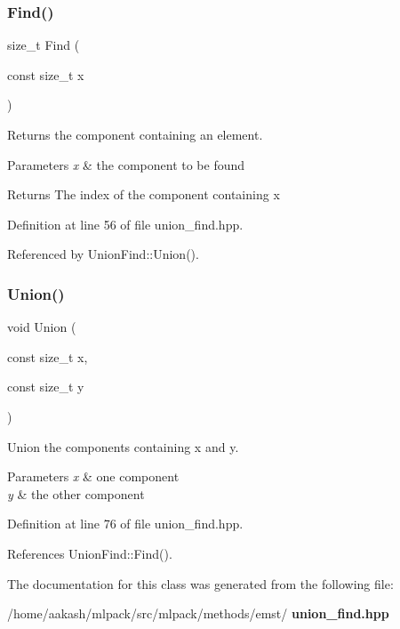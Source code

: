 \subsubsection{Find()}
{\footnotesize\ttfamily size\+\_\+t Find (\begin{DoxyParamCaption}\item[{const size\+\_\+t}]{x }\end{DoxyParamCaption})\hspace{0.3cm}{\ttfamily [inline]}}



Returns the component containing an element. 


\begin{DoxyParams}{Parameters}
{\em x} & the component to be found \\
\hline
\end{DoxyParams}
\begin{DoxyReturn}{Returns}
The index of the component containing x 
\end{DoxyReturn}


Definition at line 56 of file union\+\_\+find.\+hpp.



Referenced by Union\+Find\+::\+Union().

\mbox{\label{classmlpack_1_1emst_1_1UnionFind_a26dbea2d789bab0faff47b52ab884ea0}} 
\subsubsection{Union()}
{\footnotesize\ttfamily void Union (\begin{DoxyParamCaption}\item[{const size\+\_\+t}]{x,  }\item[{const size\+\_\+t}]{y }\end{DoxyParamCaption})\hspace{0.3cm}{\ttfamily [inline]}}



Union the components containing x and y. 


\begin{DoxyParams}{Parameters}
{\em x} & one component \\
\hline
{\em y} & the other component \\
\hline
\end{DoxyParams}


Definition at line 76 of file union\+\_\+find.\+hpp.



References Union\+Find\+::\+Find().



The documentation for this class was generated from the following file\+:\begin{DoxyCompactItemize}
\item 
/home/aakash/mlpack/src/mlpack/methods/emst/\textbf{ union\+\_\+find.\+hpp}\end{DoxyCompactItemize}
